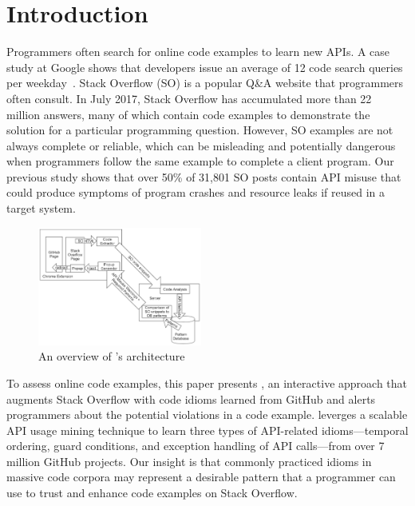 \section{Introduction}
\label{sec:intro}
Programmers often search for online code examples to learn new APIs. A case study at Google shows that developers issue an average of 12 code search queries per weekday~\cite{sadowski2015developers}. Stack Overflow (SO) is a popular Q\&A website that programmers often consult. In July 2017, Stack Overflow has accumulated more than 22 million answers, many of which contain code examples to demonstrate the solution for a particular programming question. However, SO examples are not always complete or reliable, which can be misleading and potentially dangerous when programmers follow the same example to complete a client program. Our previous study shows that over 50\% of 31,801 SO posts contain API misuse that could produce symptoms of program crashes and resource leaks if reused in a target system. %

\begin{figure}
\includegraphics[width=0.48\textwidth]{Fig1_update4.PNG}
\vspace{.1in}
\caption{An overview of {\soa}'s architecture}
\label{fig:arch}
\end{figure}

To assess online code examples, this paper presents {\soa}, an interactive approach that augments Stack Overflow with code idioms learned from GitHub and alerts programmers about the potential violations in a code example. {\soa} leverges a scalable API usage mining technique to learn three types of API-related idioms---temporal ordering, guard conditions, and exception handling of API calls---from over 7 million GitHub projects. Our insight is that commonly practiced idioms in massive code corpora may represent a desirable pattern that a programmer can use to trust and enhance code examples on Stack Overflow. 

